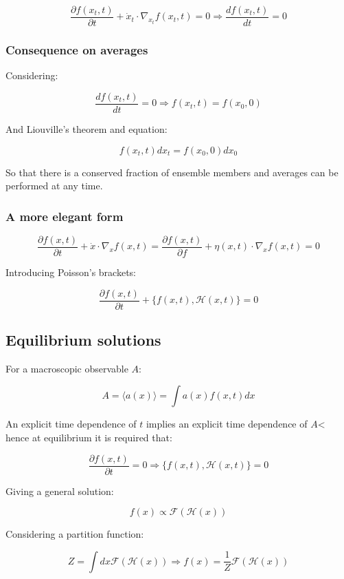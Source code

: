 	$$\frac{\partial f(x_t, t)}{\partial t} + \dot{x}_t\cdot\nabla_{x_t}f(x_t, t) = 0\Rightarrow \frac{df(x_t, t)}{dt} = 0$$

		\subsubsection{Consequence on averages}
		Considering:

		$$\frac{df(x_t, t)}{dt} = 0\Rightarrow f(x_t, t) = f(x_0, 0)$$

		And Liouville's theorem and equation:

		$$f(x_t, t)dx_t = f(x_0, 0)dx_0$$

		So that there is a conserved fraction of ensemble members and averages can be performed at any time.

		\subsubsection{A more elegant form}

		$$\frac{\partial f(x,t)}{\partial t} + \dot{x}\cdot\nabla_x f(x,t) = \frac{\partial f(x,t)}{\partial f} + \eta(x,t)\cdot\nabla_{x}f(x,t) = 0$$

		Introducing Poisson's brackets:

		$$\frac{\partial f(x,t)}{\partial t} + \{f(x,t), \mathcal{H}(x,t)\} = 0$$

	\subsection{Equilibrium solutions}
	For a macroscopic observable $A$:

	$$A = \langle a(x)\rangle = \int a(x)f(x,t)dx$$

	An explicit time dependence of $t$ implies an explicit time dependence of $A$< hence at equilibrium it is required that:

	$$\frac{\partial f(x,t)}{\partial t} = 0\Rightarrow \{f(x,t), \mathcal{H}(x, t)\} = 0$$

	Giving a general solution:

	$$f(x)\propto\mathcal{F}(\mathcal{H}(x))$$

	Considering a partition function:

	$$Z = \int dx\mathcal{F}(\mathcal{H}(x))\Rightarrow f(x) = \frac{1}{Z}\mathcal{F}(\mathcal{H}(x))$$
